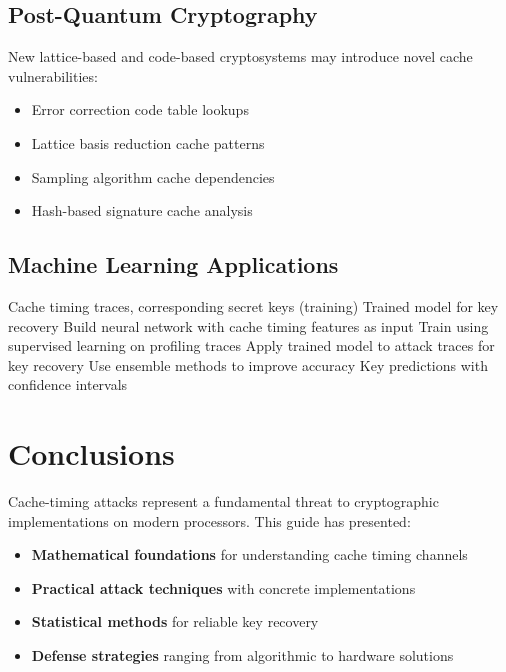 \documentclass[11pt,a4paper]{article}
\theoremstyle{definition}
\begin{document}
\subsection{Post-Quantum Cryptography}

New lattice-based and code-based cryptosystems may introduce novel cache vulnerabilities:

\begin{itemize}
    \item Error correction code table lookups
    \item Lattice basis reduction cache patterns  
    \item Sampling algorithm cache dependencies
    \item Hash-based signature cache analysis
\end{itemize}

\subsection{Machine Learning Applications}

\begin{algorithm}
\caption{Neural Network Cache Pattern Analysis}
\begin{algorithmic}[1]
\REQUIRE Cache timing traces, corresponding secret keys (training)
\ENSURE Trained model for key recovery
\STATE Build neural network with cache timing features as input
\STATE Train using supervised learning on profiling traces
\STATE Apply trained model to attack traces for key recovery
\STATE Use ensemble methods to improve accuracy
\RETURN Key predictions with confidence intervals
\end{algorithmic}
\end{algorithm}

\section{Conclusions}

Cache-timing attacks represent a fundamental threat to cryptographic implementations on modern processors. This guide has presented:

\begin{itemize}
    \item \textbf{Mathematical foundations} for understanding cache timing channels
    \item \textbf{Practical attack techniques} with concrete implementations
    \item \textbf{Statistical methods} for reliable key recovery
    \item \textbf{Defense strategies} ranging from algorithmic to hardware solutions
\end{itemize}
\end{document}
